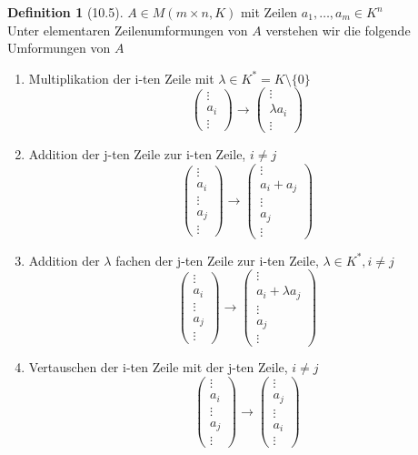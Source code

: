 \documentclass[a4paper]{scrartcl}
\theoremstyle{definition}
\newtheorem{defn}{Definition}
\theoremstyle{plain}
\theoremstyle{plain}
\theoremstyle{remark}
\theoremstyle{remark}
\theoremstyle{remark}
\theoremstyle{remark}
\theoremstyle{remark}
\begin{document}
\begin{defn}[10.5]
$A \in M(m\times n, K)$ mit Zeilen $a_1, \ldots, a_m \in K^n$ \\
  Unter elementaren Zeilenumformungen von $A$ verstehen wir die folgende Umformungen von $A$
\begin{enumerate}
\item Multiplikation der i-ten Zeile mit $\lambda \in K^\ast = K \setminus\{0\}$
     \[\begin{pmatrix} \vdots \\ a_i \\ \vdots \end{pmatrix} \to \begin{pmatrix} \vdots \\ \lambda a_i \\ \vdots \end{pmatrix}\]
\item Addition der j-ten Zeile zur i-ten Zeile, $i\neq j$
     \[\begin{pmatrix} \vdots \\ a_i \\ \vdots \\ a_j \\ \vdots\end{pmatrix} \to \begin{pmatrix} \vdots \\ a_i + a_j \\ \vdots \\ a_j  \\ \vdots \end{pmatrix}\]
\item Addition der $\lambda$ fachen der j-ten Zeile zur i-ten Zeile, $\lambda \in K^\ast, i\neq j$
     \[\begin{pmatrix} \vdots \\ a_i \\ \vdots \\ a_j \\ \vdots\end{pmatrix} \to \begin{pmatrix} \vdots \\ a_i + \lambda a_j \\ \vdots \\ a_j  \\ \vdots \end{pmatrix}\]
\item Vertauschen der i-ten Zeile mit der j-ten Zeile, $i\neq j$
     \[\begin{pmatrix} \vdots \\ a_i \\ \vdots \\ a_j \\ \vdots\end{pmatrix} \to \begin{pmatrix} \vdots \\ a_j \\ \vdots \\ a_i  \\ \vdots \end{pmatrix}\]
\end{enumerate}
\end{defn}
\end{document}

